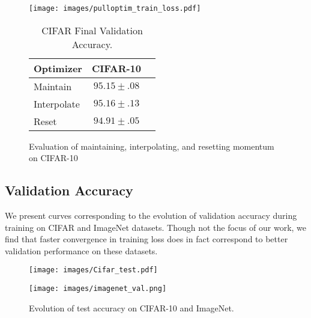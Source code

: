 \documentclass{article}
\begin{document}
\begin{figure}[t]
\centering
\begin{minipage}[t]{0.48 \linewidth}
    \centering
    \texttt{[image: images/pulloptim\_train\_loss.pdf]}
\end{minipage}
\hfill
\begin{minipage}[t]{0.48 \linewidth}
\begin{table}[H]
\begin{center}
\vspace{-1.1in}
\begin{sc}
\begin{tabular}{l c c  }
\toprule
Optimizer & CIFAR-10  \\
\midrule
Maintain & $95.15 \pm .08$  \\ 
Interpolate & $95.16 \pm .13$ \\
Reset & $94.91 \pm .05$  \\ 
\bottomrule
\end{tabular}
\end{sc}
\end{center}
\caption{CIFAR Final Validation Accuracy.}
\label{tabel:cifar-interpolation}
\end{table}
\end{minipage}
\caption{Evaluation of maintaining, interpolating, and resetting momentum on CIFAR-10}
\end{figure}

\subsection{Validation Accuracy}
We present curves corresponding to the evolution of validation accuracy during training on CIFAR and ImageNet datasets. Though not the focus of our work, we find that faster convergence in training loss does in fact correspond to better validation performance on these datasets.


\begin{figure*}
\begin{minipage}[t]{0.48 \linewidth}
    \centering
    \texttt{[image: images/Cifar\_test.pdf]}
\end{minipage}
\hfill
\begin{minipage}[t]{0.48 \linewidth}
    \centering
\texttt{[image: images/imagenet\_val.png]}
\end{minipage}
\centering
\caption{Evolution of test accuracy on CIFAR-10 and ImageNet.}
\vskip -0.1in
\label{fig:cifar-val}
\end{figure*}
\end{document}
